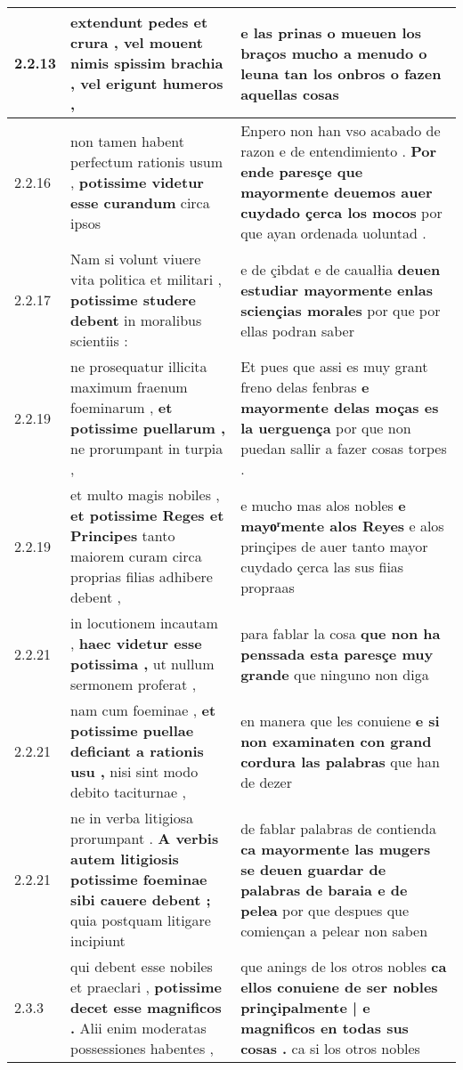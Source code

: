 \begin{tabular}{|p{1cm}|p{6.5cm}|p{6.5cm}|}
2.2.13 & extendunt pedes et crura , \textbf{ vel mouent nimis spissim brachia , } vel erigunt humeros , & e las prinas o mueuen los braços \textbf{ mucho a menudo o leuna tan los onbros } o fazen aquellas cosas \\\hline
2.2.16 & non tamen habent perfectum rationis usum , \textbf{ potissime videtur esse curandum } circa ipsos & Enpero non han vso acabado de razon e de entendimiento . \textbf{ Por ende paresçe que mayormente deuemos auer cuydado çerca los mocos } por que ayan ordenada uoluntad . \\\hline
2.2.17 & Nam si volunt viuere vita politica et militari , \textbf{ potissime studere debent } in moralibus scientiis : & e de çibdat e de caualłia \textbf{ deuen estudiar mayormente enlas sciençias morales } por que por ellas podran saber \\\hline
2.2.19 & ne prosequatur illicita maximum fraenum foeminarum , \textbf{ et potissime puellarum , } ne prorumpant in turpia , & Et pues que assi es muy grant freno delas fenbras \textbf{ e mayormente delas moças es la uerguença } por que non puedan sallir a fazer cosas torpes . \\\hline
2.2.19 & et multo magis nobiles , \textbf{ et potissime Reges et Principes } tanto maiorem curam circa proprias filias adhibere debent , & e mucho mas alos nobles \textbf{ e mayoͬmente alos Reyes } e alos prinçipes de auer tanto mayor cuydado çerca las sus fiias propraas \\\hline
2.2.21 & in locutionem incautam , \textbf{ haec videtur esse potissima , } ut nullum sermonem proferat , & para fablar la cosa \textbf{ que non ha penssada esta paresçe muy grande } que ninguno non diga \\\hline
2.2.21 & nam cum foeminae , \textbf{ et potissime puellae deficiant a rationis usu , } nisi sint modo debito taciturnae , & en manera que les conuiene \textbf{ e si non examinaten con grand cordura las palabras } que han de dezer \\\hline
2.2.21 & ne in verba litigiosa prorumpant . \textbf{ A verbis autem litigiosis potissime foeminae sibi cauere debent ; } quia postquam litigare incipiunt & de fablar palabras de contienda \textbf{ ca mayormente las mugers se deuen guardar de palabras de baraia e de pelea } por que despues que comiençan a pelear non saben \\\hline
2.3.3 & qui debent esse nobiles et praeclari , \textbf{ potissime decet esse magnificos . } Alii enim moderatas possessiones habentes , & que anings de los otros nobles \textbf{ ca ellos conuiene de ser nobles prinçipalmente | e magnificos en todas sus cosas . } ca si los otros nobles \\\hline

\end{tabular}
